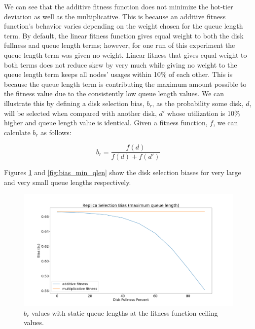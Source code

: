 \documentclass[12pt]{article}
\begin{document}
    We can see that the additive fitness function does not minimize the
    hot-tier deviation as well as the multiplicative. This is because an
    additive fitness function's behavior varies depending on the weight chosen
    for the queue length term. By default, the linear fitness function
    gives equal weight to both the disk fullness and queue length terms;
    however, for one run of this experiment the queue length term was given no
    weight. Linear fitness that gives equal weight to both terms does not
    reduce skew by very much while giving no weight to the queue length term
    keeps all nodes' usages within 10\% of each other. This is because the
    queue length term is contributing the maximum amount possible to the
    fitness value due to the consistently low queue length values. We can
    illustrate this by defining a disk selection bias, $b_r$, as the
    probability some disk, $d$, will be selected when compared with another
    disk, $d'$ whose utilization is 10\% higher and queue length value is
    identical. Given a fitness function, $f$, we can calculate $b_r$ as
    follows:

    \begin{equation}
      b_r = \frac{f(d)}{f(d) + f(d')}
    \end{equation}

    Figures \ref{fig:bias_max_qlen} and \ref{fig:bias_min_qlen} show the disk
    selection biases for very large and very small queue lengths respectively.

    \begin{figure}[h]
      \centering
      \includegraphics[scale=0.30]{images/replica_selection_bias_max_qlen.png} 
      \caption{$b_r$ values with static queue lengths at the fitness
               function ceiling values.}
      \label{fig:bias_max_qlen}
    \end{figure}
\end{document}
